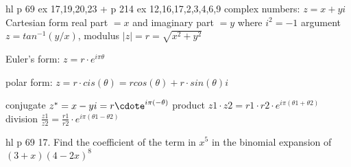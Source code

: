 hl p 69 ex 17,19,20,23
+ p 214 ex 12,16,17,2,3,4,6,9
complex numbers: $z=x+yi$ Cartesian form
real part $=x$ and imaginary part $=y$
where $i^2=-1$
argument $z=tan^{-1}(y/x)$, modulus $|z|=r=\sqrt{x^2+y^2}$

Euler's form:
$z=r\cdot e^{i\pi\theta}$

polar form: 
$z=r\cdot cis(\theta)=rcos(\theta)+r\cdot sin(\theta)i$

conjugate $z^*=x-yi=r\cdote^{i\pi(-\theta)}$ 
product $z1\cdot z2=r1\cdot r2\cdot e^{i\pi(\theta1+\theta2)}$
division $\frac{z1}{z2}=\frac{r1}{r2}\cdot e^{i\pi(\theta1-\theta2)}$

hl p 69
17. Find the coefficient of the term in $x^5$ in the binomial expansion of $(3+x)(4-2x)^8$

